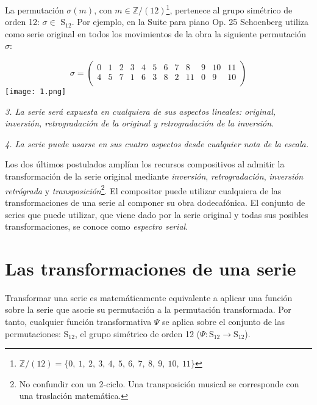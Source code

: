 	
		La permutación $\sigma(m)$, con $m\in \mathbb{Z} / (12)$\footnote{$\mathbb{Z} / (12)=\{0,\ 1,\ 2,\ 3,\ 4,\ 5,\ 6,\ 7,\ 8,\ 9,\ 10,\ 11\}$}, pertenece al grupo simétrico de orden 12: $\sigma\in$ S$_{12}$. Por ejemplo, en la Suite para piano Op. 25 Schoenberg utiliza como serie original en todos los movimientos de la obra la siguiente permutación $\sigma$:
		
		\[\sigma=\left(\begin{matrix}0&1&2&3&4&5&6&7&8&9&10&11\\4&5&7&1&6&3&8&2&11&0&9&10\\\end{matrix}\right)\]	
		\texttt{[image: 1.png]}
		
		{\it3. La serie será expuesta en cualquiera de sus aspectos lineales: original, inversión, retrogradación de la original y retrogradación de la inversión.}
		 
		{\it4. La serie puede usarse en sus cuatro aspectos desde cualquier nota de la escala.}
		
		Los dos últimos postulados amplían los recursos compositivos al admitir la transformación de la serie original mediante \emph{inversión}, \emph{retrogradación}, \emph{inversión retrógrada} y \emph{transposición}\footnote{No confundir con un 2-ciclo. Una transposición musical se corresponde con una traslación matemática.}. El compositor puede utilizar cualquiera de las transformaciones de una serie al componer su obra dodecafónica. El conjunto de series que puede utilizar, que viene dado por la serie original y todas sus posibles transformaciones, se conoce como \emph{espectro serial}.
		
	\section{Las transformaciones de una serie}
		\label{transPsi}
		Transformar una serie es matemáticamente equivalente a aplicar una función sobre la serie que asocie su permutación a la permutación transformada. Por tanto, cualquier función transformativa $\Psi$ se aplica sobre el conjunto de las permutaciones: S$_{12}$, el grupo simétrico de orden 12 ($\Psi:\text{S}_{12}\rightarrow\text{S}_{12}$).
		
